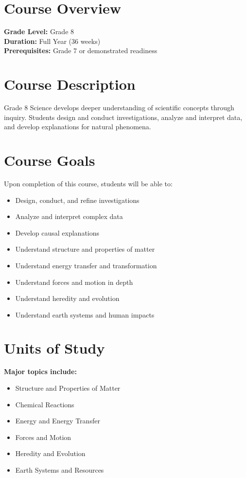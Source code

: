 \documentclass[11pt,letterpaper]{report}
\begin{document}
\section{Course Overview}

\textbf{Grade Level:} Grade 8\\
\textbf{Duration:} Full Year (36 weeks)\\
\textbf{Prerequisites:} Grade 7 or demonstrated readiness

\section{Course Description}

Grade 8 Science develops deeper understanding of scientific concepts through inquiry. Students design and conduct investigations, analyze and interpret data, and develop explanations for natural phenomena.

\section{Course Goals}

Upon completion of this course, students will be able to:

\begin{itemize}
    \item Design, conduct, and refine investigations
    \item Analyze and interpret complex data
    \item Develop causal explanations
    \item Understand structure and properties of matter
    \item Understand energy transfer and transformation
    \item Understand forces and motion in depth
    \item Understand heredity and evolution
    \item Understand earth systems and human impacts
\end{itemize}

\section{Units of Study}

\textbf{Major topics include:}
\begin{itemize}
    \item Structure and Properties of Matter
    \item Chemical Reactions
    \item Energy and Energy Transfer
    \item Forces and Motion
    \item Heredity and Evolution
    \item Earth Systems and Resources
\end{itemize}
\end{document}
